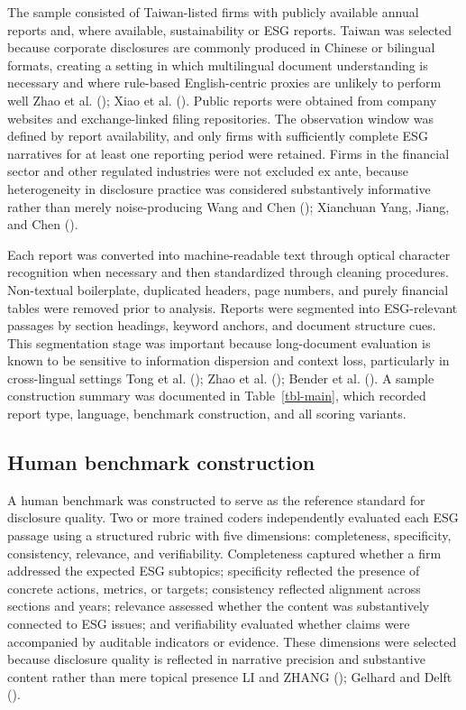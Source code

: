 \documentclass[
  12pt,
]{article}
\begin{document}
The sample consisted of Taiwan-listed firms with publicly available
annual reports and, where available, sustainability or ESG reports.
Taiwan was selected because corporate disclosures are commonly produced
in Chinese or bilingual formats, creating a setting in which
multilingual document understanding is necessary and where rule-based
English-centric proxies are unlikely to perform well Zhao et al.
(); Xiao et al.
(). Public reports were obtained from
company websites and exchange-linked filing repositories. The
observation window was defined by report availability, and only firms
with sufficiently complete ESG narratives for at least one reporting
period were retained. Firms in the financial sector and other regulated
industries were not excluded ex ante, because heterogeneity in
disclosure practice was considered substantively informative rather than
merely noise-producing Wang and Chen ();
Xianchuan Yang, Jiang, and Chen ().

Each report was converted into machine-readable text through optical
character recognition when necessary and then standardized through
cleaning procedures. Non-textual boilerplate, duplicated headers, page
numbers, and purely financial tables were removed prior to analysis.
Reports were segmented into ESG-relevant passages by section headings,
keyword anchors, and document structure cues. This segmentation stage
was important because long-document evaluation is known to be sensitive
to information dispersion and context loss, particularly in
cross-lingual settings Tong et al. (); Zhao
et al. (); Bender et al.
(). A sample construction summary was
documented in Table~\ref{tbl-main}, which recorded report type,
language, benchmark construction, and all scoring variants.

\subsection{Human benchmark
construction}\label{human-benchmark-construction}

A human benchmark was constructed to serve as the reference standard for
disclosure quality. Two or more trained coders independently evaluated
each ESG passage using a structured rubric with five dimensions:
completeness, specificity, consistency, relevance, and verifiability.
Completeness captured whether a firm addressed the expected ESG
subtopics; specificity reflected the presence of concrete actions,
metrics, or targets; consistency reflected alignment across sections and
years; relevance assessed whether the content was substantively
connected to ESG issues; and verifiability evaluated whether claims were
accompanied by auditable indicators or evidence. These dimensions were
selected because disclosure quality is reflected in narrative precision
and substantive content rather than mere topical presence LI and ZHANG
(); Gelhard and Delft
().
\end{document}
